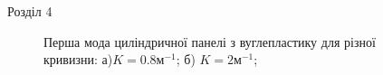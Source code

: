\documentclass[8pt]{beamer}
\numberwithin{figure}{section}
\numberwithin{equation}{section}
\numberwithin{table}{section}
\begin{document}
\begin{frame}{Розділ 4}

\begin{figure}[h]
\begin{minipage}[h]{0.49\linewidth}
\end{minipage}
\hfill
\begin{minipage}[h]{0.49\linewidth}
\end{minipage}
\caption{Перша мода циліндричної панелі з вуглепластику для різної кривизни: а)$K=0.8\text{м}^{-1}$; б)   $K=2\text{м}^{-1}$;}
\end{figure}

\end{frame}
\end{document}
